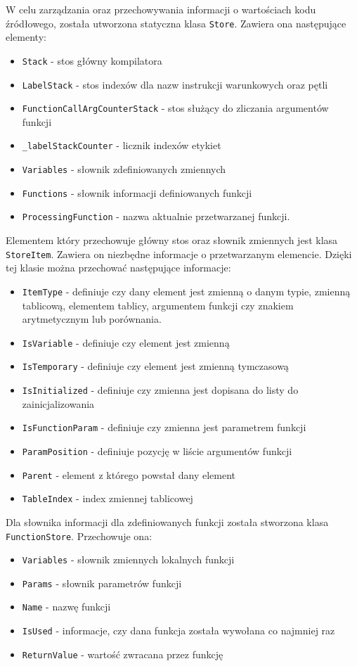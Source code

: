 \par W celu zarządzania oraz przechowywania informacji o wartościach kodu źródłowego, została utworzona statyczna klasa \texttt{Store}. Zawiera ona następujące elementy:
\begin{itemize}
  \item \texttt{Stack} - stos główny kompilatora
  \item \texttt{LabelStack} - stos indexów dla nazw instrukcji warunkowych oraz pętli
  \item \texttt{FunctionCallArgCounterStack} - stos służący do zliczania argumentów funkcji
  \item \texttt{\_labelStackCounter} - licznik indexów etykiet
  \item \texttt{Variables} - słownik zdefiniowanych zmiennych
  \item \texttt{Functions} - słownik informacji definiowanych funkcji
  \item \texttt{ProcessingFunction} - nazwa aktualnie przetwarzanej funkcji.
\end{itemize}
\par Elementem który przechowuje główny stos oraz słownik zmiennych jest klasa \texttt{StoreItem}. Zawiera on niezbędne informacje o przetwarzanym elemencie. Dzięki tej klasie można przechować następujące informacje:
\begin{itemize}
  \item \texttt{ItemType} - definiuje czy dany element jest zmienną o danym typie, zmienną tablicową, elementem tablicy, argumentem funkcji czy znakiem arytmetycznym lub porównania.
  \item \texttt{IsVariable} - definiuje czy element jest zmienną
  \item \texttt{IsTemporary} - definiuje czy element jest zmienną tymczasową
  \item \texttt{IsInitialized} - definiuje czy zmienna jest dopisana do listy do zainicjalizowania
  \item \texttt{IsFunctionParam} - definiuje czy zmienna jest parametrem funkcji
  \item \texttt{ParamPosition} - definiuje pozycję w liście argumentów funkcji
  \item \texttt{Parent} - element z którego powstał dany element
  \item \texttt{TableIndex} - index zmiennej tablicowej
\end{itemize}

\par Dla słownika informacji dla zdefiniowanych funkcji została stworzona klasa \texttt{FunctionStore}. Przechowuje ona:
\begin{itemize}
  \item \texttt{Variables} - słownik zmiennych lokalnych funkcji
  \item \texttt{Params} - słownik parametrów funkcji
  \item \texttt{Name} - nazwę funkcji
  \item \texttt{IsUsed} - informacje, czy dana funkcja została wywołana co najmniej raz
  \item \texttt{ReturnValue} - wartość zwracana przez funkcję
\end{itemize}

